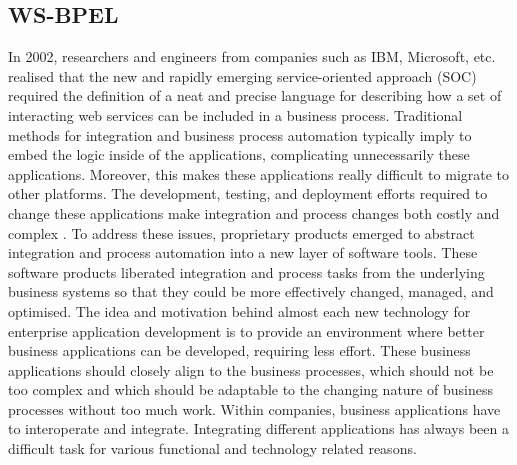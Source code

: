 \subsection{WS-BPEL}
In 2002, researchers and engineers from companies such as IBM, Microsoft, etc.
realised that the new and rapidly emerging service-oriented approach (SOC) required the definition of 
a neat and precise language for describing how a set of interacting web services can be included
in a business process. Traditional methods for integration and business process automation 
typically imply to embed the logic inside of the applications, complicating unnecessarily these applications. 
Moreover, this makes these applications really difficult to migrate to other platforms. 
The development, testing, and deployment efforts required 
to change these applications make integration and process changes both costly and complex \cite{bpelsoftcare}.
To address these issues, proprietary products emerged 
to abstract integration and process automation into a new layer of software tools. 
These software products liberated integration and process tasks from 
the underlying business systems so that they could be more effectively changed, managed, and optimised.
The idea and motivation behind almost each new technology for
enterprise application development is to provide an environment where better
business applications can be developed, requiring less effort. These business applications
should closely align to the business processes, which should not be too complex and
which should be adaptable to the changing nature of business processes without too much
work. Within companies, business applications have to
interoperate and integrate. Integrating different
applications has always been a difficult task for various functional and technology
related reasons.

